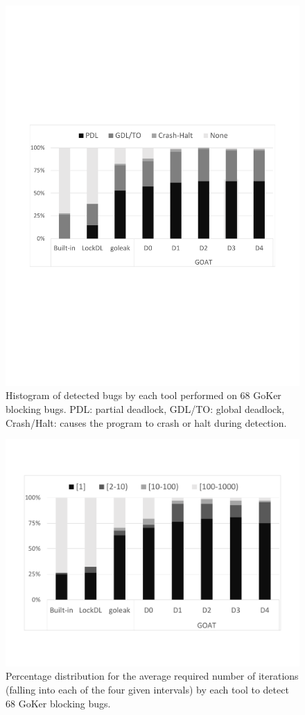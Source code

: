 \begin{figure}
\centering
  \includegraphics[width=.85\linewidth]{figs/P4_detections.pdf}
  \caption{Histogram of detected bugs by each tool performed on 68 GoKer blocking bugs. PDL: partial deadlock, GDL/TO: global deadlock, Crash/Halt: causes the program to crash or halt during detection.}
  \label{fig:detection}
\end{figure}


\begin{figure}
\centering
  \includegraphics[width=.85\linewidth]{figs/P4_runs2.pdf}
  \caption{Percentage distribution for the average required number of iterations (falling into each of the four given intervals) by each tool to detect 68 GoKer blocking bugs.}
  \label{fig:runs}
\end{figure}


